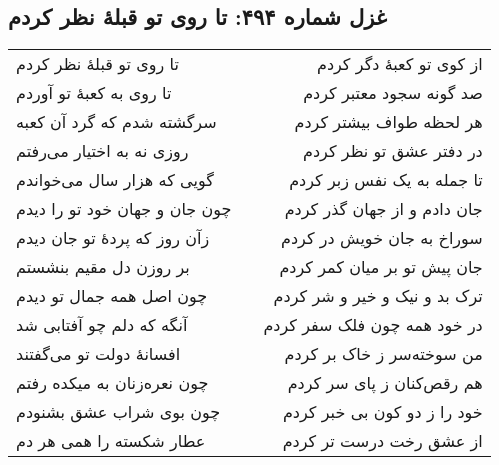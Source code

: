 \begin{center}
\section*{غزل شماره ۴۹۴: تا روی تو قبلهٔ نظر کردم}
\label{sec:494}
\begin{longtable}{l p{0.5cm} r}
تا روی تو قبلهٔ نظر کردم
&&
از کوی تو کعبهٔ دگر کردم
\\
تا روی به کعبهٔ تو آوردم
&&
صد گونه سجود معتبر کردم
\\
سرگشته شدم که گرد آن کعبه
&&
هر لحظه طواف بیشتر کردم
\\
روزی نه به اختیار می‌رفتم
&&
در دفتر عشق تو نظر کردم
\\
گویی که هزار سال می‌خواندم
&&
تا جمله به یک نفس زبر کردم
\\
چون جان و جهان خود تو را دیدم
&&
جان دادم و از جهان گذر کردم
\\
زآن روز که پردهٔ تو جان دیدم
&&
سوراخ به جان خویش در کردم
\\
بر روزن دل مقیم بنشستم
&&
جان پیش تو بر میان کمر کردم
\\
چون اصل همه جمال تو دیدم
&&
ترک بد و نیک و خیر و شر کردم
\\
آنگه که دلم چو آفتابی شد
&&
در خود همه چون فلک سفر کردم
\\
افسانهٔ دولت تو می‌گفتند
&&
من سوخته‌سر ز خاک بر کردم
\\
چون نعره‌زنان به میکده رفتم
&&
هم رقص‌کنان ز پای سر کردم
\\
چون بوی شراب عشق بشنودم
&&
خود را ز دو کون بی خبر کردم
\\
عطار شکسته را همی هر دم
&&
از عشق رخت درست تر کردم
\\
\end{longtable}
\end{center}

